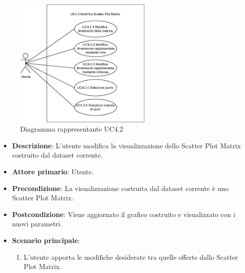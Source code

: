 \begin{figure}[h]
    \centering
    \includegraphics[width=0.6\textwidth]{componenti/casi-duso/diagrammi/UC4_2.pdf}
    \caption{Diagramma rappresentante UC4.2}
    \label{fig:UC4.2}
\end{figure}


\begin{itemize}
    \item \textbf{Descrizione}: L’utente modifica la visualizzazione dello Scatter Plot Matrix
                                costruito dal dataset corrente.

    \item \textbf{Attore primario}: Utente.

    \item \textbf{Precondizione}:   La visualizzazione costruita dal dataset corrente è uno Scatter Plot Matrix.

    \item \textbf{Postcondizione}:  Viene aggiornato il grafico costruito e visualizzato con i nuovi parametri.

	\item \textbf{Scenario principale}:
		\begin{enumerate}
            \item L'utente apporta le modifiche desiderate tra quelle offerte dallo Scatter Plot Matrix.
        \end{enumerate}
\end{itemize}


